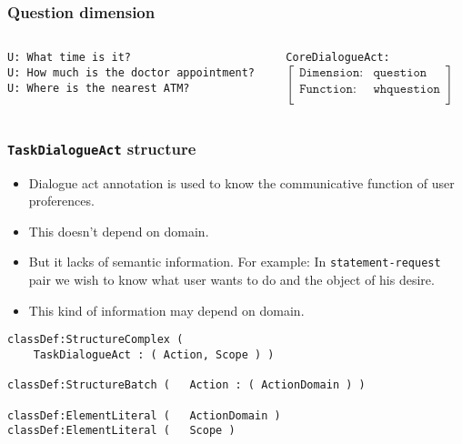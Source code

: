 \documentclass[11pt]{beamer}
\begin{document}
\begin{frame}[fragile]
\frametitle{Question dimension}
	\begin{center}
	\end{center}
	\vspace{15pt}
	\begin{columns}
		\begin{column}{0.60\textwidth}
		{\color{teal} 
			\texttt{U: What time is it?}\\
			\vspace{10pt}
			\texttt{U: How much is the doctor appointment?}\\
			\vspace{10pt}
			\texttt{U: Where is the nearest ATM?}\\
		}
		\end{column}
		\begin{column}{0.40\textwidth}
			\footnotesize
			\texttt{CoreDialogueAct:} \\
				\vspace{10pt}
				$\begin{bmatrix}
						\texttt{Dimension:}    & \texttt{question}\\ 
						\texttt{Function:}     & \texttt{whquestion}\\ 
				\end{bmatrix}$
		\end{column}
	\end{columns}
\end{frame}

\begin{frame}[fragile]
\frametitle{\texttt{TaskDialogueAct} structure}
	\begin{itemize}
		\item Dialogue act annotation is used to know the communicative function of user proferences.
		\item This doesn't depend on domain.
		\item But it lacks of semantic information. For example: In \texttt{statement-request} pair we wish to know what user wants to do and the object of his desire.
		\item This kind of information may depend on domain.
	\end{itemize}
	\scriptsize
	\pause
	\begin{lstlisting}[language=lekta]
classDef:StructureComplex ( 
	TaskDialogueAct : ( Action, Scope ) )

classDef:StructureBatch (	Action : ( ActionDomain ) )

classDef:ElementLiteral (	ActionDomain )
classDef:ElementLiteral (	Scope )
	\end{lstlisting}	
\end{frame}
\end{document}

